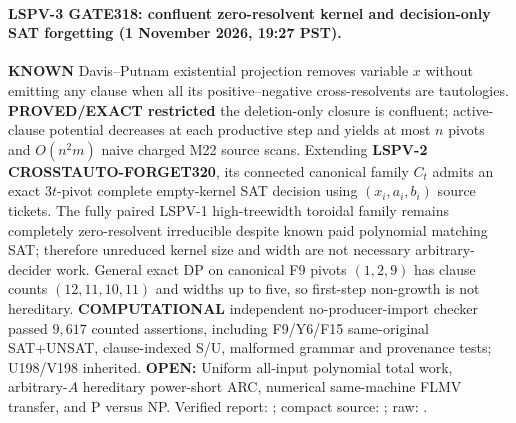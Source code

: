 \paragraph{LSPV-3 GATE318: confluent zero-resolvent kernel and decision-only SAT forgetting (1 November 2026, 19:27 PST).}
\textbf{KNOWN} Davis--Putnam existential projection removes variable $x$ without emitting any clause when all its positive--negative cross-resolvents are tautologies.
\textbf{PROVED/EXACT restricted} the deletion-only closure is confluent; active-clause potential decreases at each productive step and yields at most $n$ pivots and $O(n^2m)$ naive charged M22 source scans.
Extending \textbf{LSPV-2 CROSSTAUTO-FORGET320}, its connected canonical family $C_t$ admits an exact $3t$-pivot complete empty-kernel SAT decision using $(x_i,a_i,b_i)$ source tickets.
The fully paired LSPV-1 high-treewidth toroidal family remains completely zero-resolvent irreducible despite known paid polynomial matching SAT; therefore unreduced kernel size and width are not necessary arbitrary-decider work.
General exact DP on canonical F9 pivots $(1,2,9)$ has clause counts $(12,11,10,11)$ and widths up to five, so first-step non-growth is not hereditary.
\textbf{COMPUTATIONAL} independent no-producer-import checker passed $9{,}617$ counted assertions, including F9/Y6/F15 same-original SAT+UNSAT, clause-indexed S/U, malformed grammar and provenance tests; U198/V198 inherited.
\textbf{OPEN:} Uniform all-input polynomial total work, arbitrary-$A$ hereditary power-short ARC, numerical same-machine FLMV transfer, and P versus NP.
Verified report: ;
compact source: ;
raw: .
